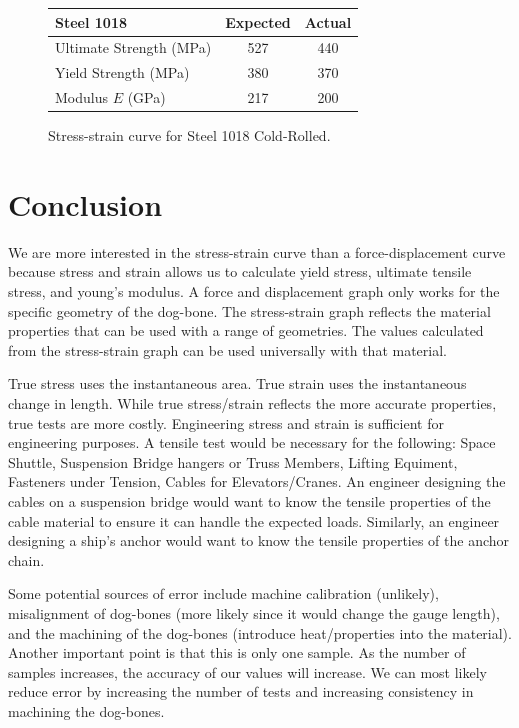 \documentclass[conf]{new-aiaa} %
\begin{document}
\begin{figure}[h!]
\begin{minipage}{0.48\textwidth}
    \caption{Stress-strain curve for Steel 1018 Cold-Rolled.}
    \label{fig:steel}
    \vspace{2em}
    \renewcommand{\arraystretch}{1.3}
    \begin{tabular}{lcc}
    \toprule
    \textbf{Steel 1018} & Expected & Actual \\
    \midrule
    Ultimate Strength (MPa) & 527 & 440 \\ 
    Yield Strength (MPa)    & 380 & 370 \\ 
    Modulus $E$ (GPa)       & 217 & 200 \\ 
    \bottomrule
    \end{tabular}
    \label{tab:steel}
\end{minipage}

\end{figure}

\section{Conclusion}
We are more interested in the stress-strain curve than a force-displacement curve because stress and strain allows us to calculate yield stress, ultimate tensile stress, and young's modulus.
A force and displacement graph only works for the specific geometry of the dog-bone.
The stress-strain graph reflects the material properties that can be used with a range of geometries.
The values calculated from the stress-strain graph can be used universally with that material.

True stress uses the instantaneous area.
True strain uses the instantaneous change in length.
While true stress/strain reflects the more accurate properties, true tests are more costly.
Engineering stress and strain is sufficient for engineering purposes.
A tensile test would be necessary for the following: Space Shuttle, Suspension Bridge hangers or Truss Members, Lifting Equiment, Fasteners under Tension, Cables for Elevators/Cranes.
An engineer designing the cables on a suspension bridge would want to know the tensile properties of the cable material to ensure it can handle the expected loads.
Similarly, an engineer designing a ship's anchor would want to know the tensile properties of the anchor chain.

Some potential sources of error include machine calibration (unlikely), misalignment of dog-bones (more likely since it would change the gauge length), and the machining of the dog-bones (introduce heat/properties into the material).
Another important point is that this is only one sample.
As the number of samples increases, the accuracy of our values will increase.
We can most likely reduce error by increasing the number of tests and increasing consistency in machining the dog-bones.


% 
% 
\end{document}
